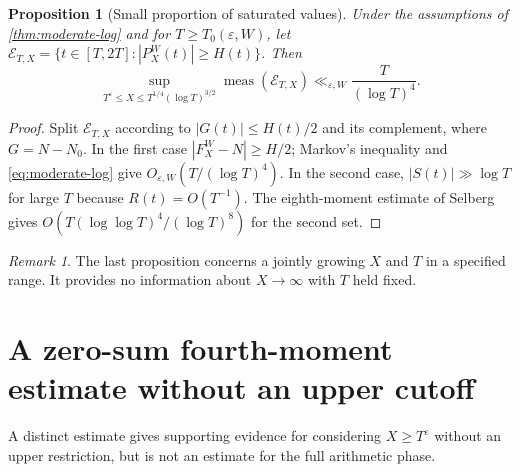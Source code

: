 \documentclass[11pt,a4paper]{article}
\numberwithin{equation}{section}
\newtheorem{proposition}[theorem]{Proposition}
\theoremstyle{definition}
\theoremstyle{remark}
\newtheorem{remark}[theorem]{Remark}
\newcommand{\meas}{\operatorname{meas}}
\begin{document}
\begin{proposition}[Small proportion of saturated values]\label{prop:sat-measure}
Under the assumptions of \cref{thm:moderate-log} and for $T\ge T_0(\varepsilon,W)$, let
$\mathcal E_{T,X}=\{t\in[T,2T]:|P_X^W(t)|\ge H(t)\}$.
Then
\begin{equation}\label{eq:sat-measure}
\sup_{T^\varepsilon\le X\le T^{1/4}(\log T)^{3/2}}
\meas(\mathcal E_{T,X})\ll_{\varepsilon,W}\frac{T}{(\log T)^4}.
\end{equation}
\end{proposition}
\begin{proof}
Split $\mathcal E_{T,X}$ according to $|G(t)|\le H(t)/2$ and its
complement, where $G=N-N_0$. In the first case $|F_X^W-N|\ge H/2$;
Markov's inequality and \eqref{eq:moderate-log} give
$O_{\varepsilon,W}(T/(\log T)^4)$. In the second case,
$|S(t)|\gg\log T$ for large $T$ because $R(t)=O(T^{-1})$.
The eighth-moment estimate of Selberg \cite{Selberg1946,Titchmarsh} gives
$O(T(\log\log T)^4/(\log T)^8)$ for the second set.
\end{proof}
\begin{remark}
The last proposition concerns a jointly growing $X$ and $T$ in a specified
range. It provides no information about $X\to\infty$ with $T$ held fixed.
\end{remark}

\section{A zero-sum fourth-moment estimate without an upper cutoff}\label{sec:zero-sum}
A distinct estimate gives supporting evidence for considering $X\ge T^\varepsilon$ without an upper restriction, but is not an estimate for the full arithmetic phase.
\end{document}
